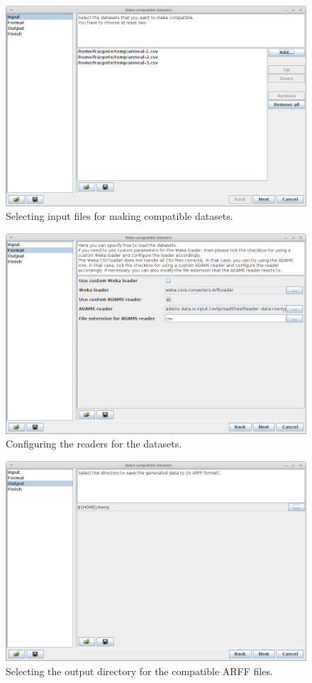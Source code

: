 \begin{figure}[htb]
  \centering
  \includegraphics[width=12.0cm]{images/makecompatible1.png}
  \caption{Selecting input files for making compatible datasets.}
  \label{makecompatible1}
\end{figure}

\begin{figure}[htb]
  \centering
  \includegraphics[width=12.0cm]{images/makecompatible2.png}
  \caption{Configuring the readers for the datasets.}
  \label{makecompatible2}
\end{figure}

\begin{figure}[htb]
  \centering
  \includegraphics[width=12.0cm]{images/makecompatible3.png}
  \caption{Selecting the output directory for the compatible ARFF files.}
  \label{makecompatible3}
\end{figure}

